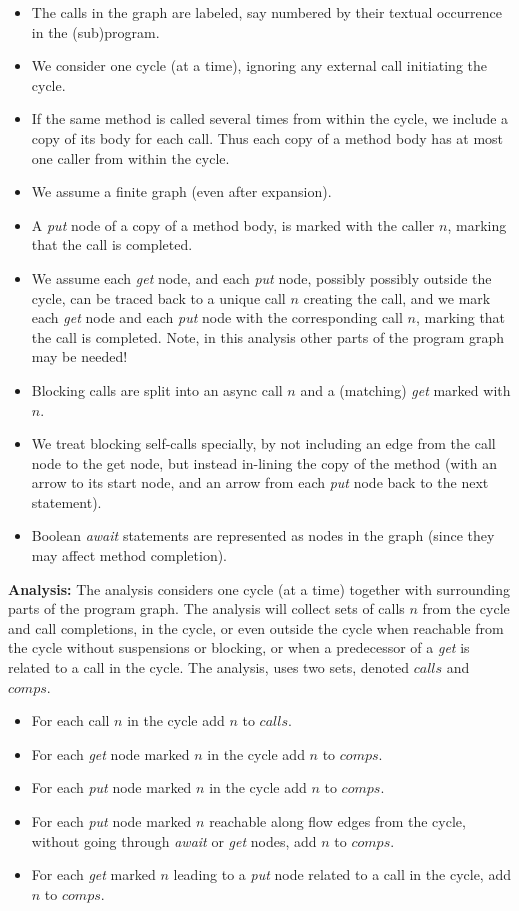 \documentclass[12pt]{article}%
\begin{document}
\begin{itemize}
\item
The calls in the graph are labeled, 
say numbered by their textual occurrence in the (sub)program.
\item
 We consider one cycle (at a time),
ignoring any external call initiating the cycle.
\item
If the same method is called several times from within the cycle,
we include a copy of its body for each call.
Thus each copy of a  method body has  at most  one caller from within the cycle.
\item
We assume a finite graph (even after expansion).
\item 
A  \emph{put} node of a copy of a method body, is marked with the 
caller $n$, marking that the call is completed.
\item
We assume each \emph{get}  node,
and each \emph{put} node, possibly
possibly outside the cycle, 
can be traced back to a unique call $n$ creating the call,
and we mark each  \emph{get} node and each  \emph{put} node  with the corresponding call  $n$, marking that the call is 
completed.
Note, in this analysis other parts of the program graph may be needed!
\item
Blocking calls are split into an async call $n$ and a (matching) \emph{get}
marked with  $n$.
\item
We treat blocking self-calls specially,
by not including an edge from the call node to the get node,
but instead  in-lining  the copy of the method
 (with an arrow to its
start node, and an arrow from each  \emph{put} node
back to the next statement).
\item
Boolean \emph{await} statements are represented as nodes in the graph
(since they may affect method completion).

\end{itemize}
\textbf{Analysis:}
The analysis considers one cycle (at a time)
together with surrounding parts of the program graph.
The analysis will collect sets of calls $n$ from the cycle and call completions,
in  the cycle, or even outside  the cycle when  reachable from the cycle without suspensions or blocking,
or  when a predecessor of  a \emph{get} is related to a call in the cycle.
The analysis, uses two sets, denoted $calls$ and $comps$.
\begin{itemize}
\item For each call $n$ in the cycle add $n$ to $calls$.
\item For each \emph{get} node  marked   $n$ in the cycle add   $n$ to  $comps$.
\item For each \emph{put} node  marked   $n$ in the cycle  add   $n$ to  $comps$.
\item  For each \emph{put} node marked   ${n}$ reachable along flow edges from the cycle, 
without going through \emph{await} or  \emph{get} nodes,
 add   ${n}$ to  $comps$.
\item  For each \emph{get}  marked   ${n}$ 
leading to a \emph{put}  node
related to a call in the cycle,
 add   ${n}$ to  $comps$.
\end{itemize}
\end{document}
